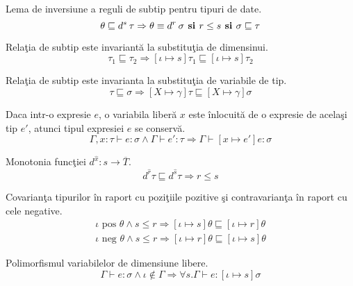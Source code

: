 \begin{lemma}\label{sub_inversion}
Lema de inversiune a reguli de subtip pentru tipuri de date.
$$ \theta \sqsubseteq d^s\hspace{2pt} \tau \Rightarrow \theta \equiv d^r \hspace{2pt} \sigma \textbf{ si } r \le s \textbf{ si } \sigma \sqsubseteq \tau $$
\end{lemma}

\begin{lemma}
Rela\c tia de subtip este invariant\u a la substitu\c tia de dimensinui.
$$ \tau_1 \sqsubseteq \tau_2 \Rightarrow [\iota \mapsto s]\tau_1 \sqsubseteq [\iota \mapsto s]\tau_2$$
\end{lemma}

\begin{lemma}\label{subst_sub}
Rela\c tia de subtip este invarianta la substitu\c tia de variabile de tip.
$$\tau \sqsubseteq \sigma \Rightarrow [X \mapsto \gamma]\tau \sqsubseteq [X \mapsto \gamma] \sigma $$
\end{lemma}

\begin{lemma}\label{subst_var}
Daca intr-o expresie $e$, o variabila liber\u a $x$ este \^ inlocuit\u a de o expresie de acela\c si tip $e'$, atunci tipul expresiei $e$ se conserv\u a.
$$\Gamma , x : \tau \vdash e : \sigma \wedge \Gamma \vdash e' : \tau \Rightarrow \Gamma \vdash [x \mapsto e']e : \sigma $$
\end{lemma}

\begin{lemma}\label{stage_inversion}
Monotonia func\c tiei $d^{\hat{x}} : s \to \overline{T}$.
$$ d^{\hat{r}} \tau \sqsubseteq d^{\hat{s}} \tau \Rightarrow r \le s$$
\end{lemma}

\begin{lemma} \label{stage_pos_subst}
Covarian\c ta tipurilor \^ in raport cu pozi\c tiile pozitive \c si contravarian\c ta \^ in raport cu cele negative.
\begin{gather*}
 \iota \text{ pos } \theta \wedge s \le r \Rightarrow [\iota \mapsto s] \theta \sqsubseteq [\iota \mapsto r] \theta \\
 \iota \text{ neg } \theta \wedge s \le r \Rightarrow [\iota \mapsto r] \theta \sqsubseteq [\iota \mapsto s] \theta
\end{gather*}
\end{lemma}

\begin{lemma}\label{stage_subst}
Polimorfismul variabilelor de dimensiune libere.
$$\Gamma \vdash e : \sigma \wedge  \iota \notin \Gamma \Rightarrow \forall s. \Gamma \vdash e : [\iota \mapsto s] \sigma$$
\end{lemma}


